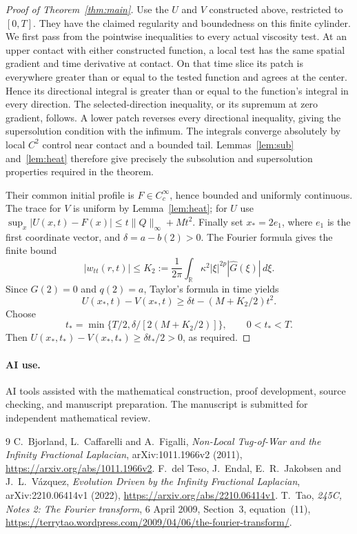 \documentclass[11pt]{article}
\newcommand{\R}{\mathbb R}
\newcommand{\norm}[1]{\lVert#1\rVert_\infty}
\begin{document}
\begin{proof}[Proof of Theorem~\ref{thm:main}]
Use the $U$ and $V$ constructed above, restricted to $[0,T]$. They have the
claimed regularity and boundedness on this finite cylinder.
We first pass from the pointwise inequalities to every actual viscosity test.
At an upper contact with either constructed function, a local test has the same
spatial gradient and time derivative at contact. On that time slice its patch
is everywhere greater than or equal to the tested function and agrees at the
center. Hence its directional integral is greater than or equal to the
function's integral in every direction. The selected-direction inequality,
or its supremum at zero gradient, follows. A lower patch reverses every
directional inequality, giving the supersolution condition with the infimum.
The integrals converge absolutely by local $C^2$ control near contact and a
bounded tail. Lemmas~\ref{lem:sub} and~\ref{lem:heat} therefore give precisely
the subsolution and supersolution properties required in the theorem.

Their common initial profile is $F\in C_c^\infty$, hence bounded and uniformly
continuous. The trace for $V$ is uniform by Lemma~\ref{lem:heat}; for $U$ use
$\sup_x|U(x,t)-F(x)|\le t\norm Q+Mt^2$.
Finally set $x_*=2e_1$, where $e_1$ is the first coordinate vector, and
$\delta=a-b(2)>0$. The Fourier formula gives the finite bound
\[
 |w_{tt}(r,t)|\le K_2:=\frac1{2\pi}\int_\R
 \kappa^2|\xi|^{2p}|\widehat G(\xi)|\,d\xi.
\]
Since $G(2)=0$ and $q(2)=a$, Taylor's formula in time yields
\[
 U(x_*,t)-V(x_*,t)\ge\delta t-(M+K_2/2)t^2.
\]
Choose
\[
 t_*=\min\{T/2,\delta/[2(M+K_2/2)]\},\qquad 0<t_*<T.
\]
Then $U(x_*,t_*)-V(x_*,t_*)\ge\delta t_*/2>0$, as required.
\end{proof}

\paragraph{AI use.}
AI tools assisted with the mathematical construction, proof development,
source checking, and manuscript preparation. The manuscript is submitted for
independent mathematical review.

\begin{thebibliography}{9}
C.~Bjorland, L.~Caffarelli and A.~Figalli,
\emph{Non-Local Tug-of-War and the Infinity Fractional Laplacian},
arXiv:1011.1966v2 (2011),
\url{https://arxiv.org/abs/1011.1966v2}.
F.~del Teso, J.~Endal, E.~R.~Jakobsen and J.~L.~V\'azquez,
\emph{Evolution Driven by the Infinity Fractional Laplacian},
arXiv:2210.06414v1 (2022),
\url{https://arxiv.org/abs/2210.06414v1}.
T.~Tao, \emph{245C, Notes 2: The Fourier transform},
6 April 2009, Section~3, equation~(11),
\url{https://terrytao.wordpress.com/2009/04/06/the-fourier-transform/}.
\end{thebibliography}
\end{document}
